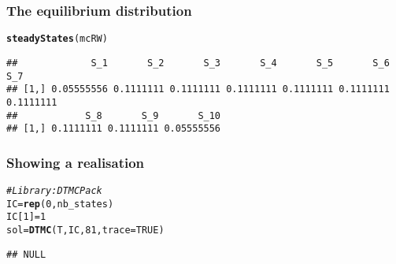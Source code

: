 \documentclass[aspectratio=169]{beamer}\usepackage[]{graphicx}\usepackage[]{xcolor}
\makeatletter
\newcommand{\hlnum}[1]{\textcolor[rgb]{0.686,0.059,0.569}{#1}}%
\newcommand{\hlcom}[1]{\textcolor[rgb]{0.678,0.584,0.686}{\textit{#1}}}%
\newcommand{\hldef}[1]{\textcolor[rgb]{0.345,0.345,0.345}{#1}}%
\newcommand{\hlkwb}[1]{\textcolor[rgb]{0.69,0.353,0.396}{#1}}%
\newcommand{\hlkwc}[1]{\textcolor[rgb]{0.333,0.667,0.333}{#1}}%
\newcommand{\hlkwd}[1]{\textcolor[rgb]{0.737,0.353,0.396}{\textbf{#1}}}%
\newenvironment{kframe}{%
 \def\at@end@of@kframe{}%
 \ifinner\ifhmode%
  \def\at@end@of@kframe{\end{minipage}}%
  \begin{minipage}{\columnwidth}%
 \fi\fi%
 \def\FrameCommand##1{\hskip\@totalleftmargin \hskip-\fboxsep
 \colorbox{shadecolor}{##1}\hskip-\fboxsep
     \hskip-\linewidth \hskip-\@totalleftmargin \hskip\columnwidth}%
 \MakeFramed {\advance\hsize-\width
   \@totalleftmargin\z@ \linewidth\hsize
   \@setminipage}}%
 {\par\unskip\endMakeFramed%
 \at@end@of@kframe}
\newenvironment{knitrout}{}{} %
\makeatother
\begin{document}
\begin{frame}[fragile]\frametitle{The equilibrium distribution}
\begin{knitrout}
\color{fgcolor}\begin{kframe}
\begin{alltt}
\hlkwd{steadyStates}\hldef{(mcRW)}
\end{alltt}
\begin{verbatim}
##             S_1       S_2       S_3       S_4       S_5       S_6       S_7
## [1,] 0.05555556 0.1111111 0.1111111 0.1111111 0.1111111 0.1111111 0.1111111
##            S_8       S_9       S_10
## [1,] 0.1111111 0.1111111 0.05555556
\end{verbatim}
\end{kframe}
\end{knitrout}
\end{frame}

\begin{frame}[fragile]\frametitle{Showing a realisation}
\begin{knitrout}
\color{fgcolor}\begin{kframe}
\begin{alltt}
\hlcom{# Library: DTMCPack}
\hldef{IC} \hlkwb{=} \hlkwd{rep}\hldef{(}\hlnum{0}\hldef{, nb_states)}
\hldef{IC[}\hlnum{1}\hldef{]} \hlkwb{=} \hlnum{1}
\hldef{sol} \hlkwb{=} \hlkwd{DTMC}\hldef{(T, IC,} \hlnum{81}\hldef{,} \hlkwc{trace}\hldef{=}\hlnum{TRUE}\hldef{)}
\end{alltt}
\begin{verbatim}
## NULL
\end{verbatim}
\end{kframe}
\end{knitrout}
\end{frame}

\end{document}
